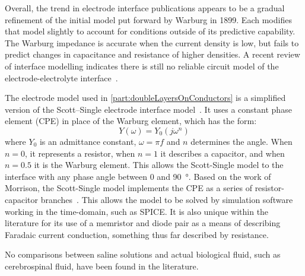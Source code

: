     Overall, the trend in electrode interface publications appears to be a gradual refinement of the initial model put forward by Warburg in 1899.
    Each modifies that model slightly to account for conditions outside of its predictive capability.
    The Warburg impedance is accurate when the current density is low, but fails to predict changes in capacitance and resistance of higher densities.
    A recent review of interface modelling indicates there is still no reliable circuit model of the electrode-electrolyte interface~\cite{Geddes1997}.

    The electrode model used in \cref{part:doubleLayersOnConductors} is a simplified version of the Scott--Single electrode interface model~\cite{Scott2014}.
    It uses a constant phase element (CPE) in place of the Warburg element, which has the form:
    \begin{equation}
      Y(\omega) = Y_0 (j\omega^n)
      \label{eqn:CPE_equation}
    \end{equation}
    where $Y_0$ is an admittance constant, $\omega = \pi f$ and $n$ determines the angle.
    When $n=0$, it represents a resistor, when $n=1$ it describes a capacitor, and when $n=0.5$ it is the Warburg element.
    This allows the Scott-Single model to the interface with any phase angle between 0 and \SI{90}{\degree}.
    Based on the work of Morrison, the Scott-Single model implements the CPE as a series of resistor-capacitor branches~\cite{Morrison1959}.
    This allows the model to be solved by simulation software working in the time-domain, such as SPICE.
    It is also unique within the literature for its use of a memristor and diode pair as a means of describing Faradaic current conduction, something thus far described by resistance.

    No comparisons between saline solutions and actual biological fluid, such as cerebrospinal fluid, have been found in the literature.

